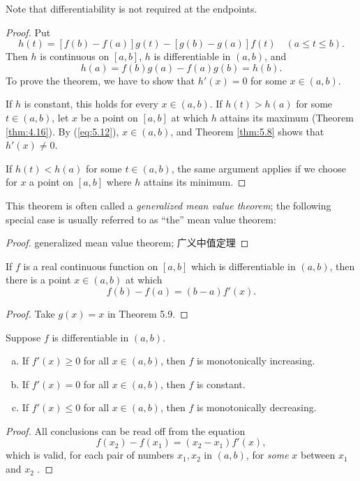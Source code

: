 Note that differentiability is not required at the endpoints.

\begin{proof}
    Put 
    \begin{equation*}
        h(t) = 
        \left[ f(b) - f(a) \right]g(t) -
        \left[ g(b) - g(a) \right]f(t)
        \quad
        (a \leq t \leq b).
    \end{equation*}
    Then $h$ is continuous on $[a,b]$, $h$ is differentiable in $(a, b)$, and
    \begin{equation}
        \label{eq:5.12}
        h(a) = f(b)g(a) - f(a)g(b) = h(b).
    \end{equation}
    To prove the theorem, we have to show that $h'(x) = 0$ for some $x \in (a, b)$.

    If $h$ is constant, this holds for every $x \in (a, b)$.
    If $h(t) > h(a)$ for some $t \in (a, b)$, 
    let $x$ be a point on $[a, b]$ 
    at which $h$ attains its maximum (Theorem \ref{thm:4.16}).
    By (\ref{eq:5.12}), $x \in (a, b)$, 
    and Theorem \ref{thm:5.8} shows that $h'(x) \neq 0$.

    If $h(t) < h(a)$ for some $t \in (a, b)$, 
    the same argument applies if we choose for $x$ a point on $[a, b]$ 
    where $h$ attains its minimum.
\end{proof}

This theorem is often called a \emph{generalized mean value theorem}; 
the following special case is usually referred to as ``the'' mean value theorem:
\begin{proof}
    generalized mean value theorem; 广义中值定理
\end{proof}

\begin{thm}
    \label{thm:5.10} 
    If $f$ is a real continuous function on $[a, b]$ 
    which is differentiable in $(a, b)$, 
    then there is a point $x \in (a, b)$ at which 
    \begin{equation*}
        f(b) - f(a) = (b - a)f'(x).
    \end{equation*}
\end{thm}
\begin{proof}
    Take $g(x) = x$ in Theorem 5.9.
\end{proof}

\begin{thm}
    \label{thm:5.11}
    Suppose $f$ is differentiable in $(a, b)$.
    \begin{enumerate}[(a)]
        \item If $f'(x) \geq 0$ for all $x \in (a, b)$, then $f$ is monotonically increasing.
        \item If $f'(x) = 0$ for all $x \in (a, b)$, then $f$ is constant.
        \item If $f'(x) \leq 0$ for all $x \in (a, b)$, then $f$ is monotonically decreasing.
    \end{enumerate}
\end{thm}

\begin{proof}
    All conclusions can be read off from the equation
    \begin{equation*}
        f(x_2) - f(x_1) = (x_2 - x_1)f'(x),
    \end{equation*}
    which is valid, for each pair of numbers $x_1, x_2$ in $(a, b)$, 
    for \emph{some} $x$ between $x_1$ and $x_2$ .
\end{proof}